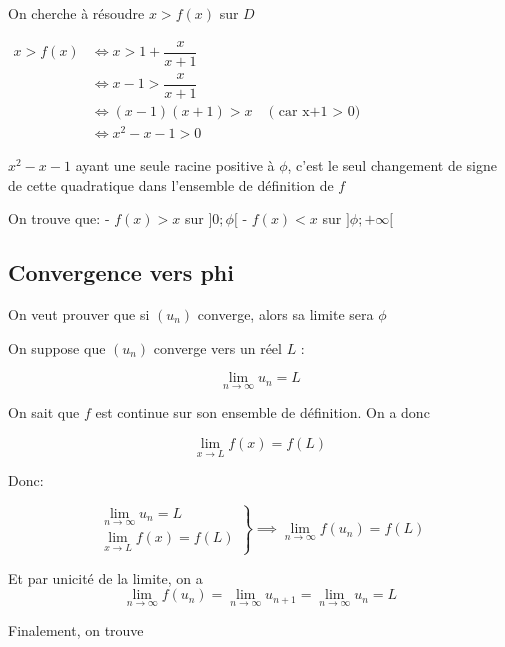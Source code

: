 \documentclass[]{scrartcl}
\begin{document}
\vspace*{2cm}{}

On cherche à résoudre \(x > f(x)\) sur \(D\)

\(\begin{array}{cl} x > f (x) &\iff x > 1 + \dfrac{x}{x+1}\\[3ex] &\iff x - 1 > \dfrac{x}{x+1}\\[3ex] &\iff (x - 1)(x+1) > x \;\;\; \text{ ( car x+1 > 0)}\\[2ex] &\iff x^2 - x - 1 > 0 \end{array}\)

\vspace*{2cm}{}

\(x^2 - x - 1\) ayant une seule racine positive à \(\phi\), c'est le
seul changement de signe de cette quadratique dans l'ensemble de
définition de \(f\)

On trouve que: - \(f(x) > x\) sur \(]0 ; \phi[\) - \(f(x) < x\) sur
\(]\phi; +\infty[\)

\vspace*{2cm}{}

\hypertarget{convergence-vers-phi}{%
\subsection{Convergence vers phi}\label{convergence-vers-phi}}

On veut prouver que si \((u_n)\) converge, alors sa limite sera \(\phi\)

On suppose que \((u_n)\) converge vers un réel \(L\) :

\[
\lim_{n \to\infty} u_n = L
\]

\vspace*{2cm}{}

On sait que \(f\) est continue sur son ensemble de définition. On a donc

\[
\lim_{x \to L} f(x) = f(L)
\]

Donc:

\[
\left .
\begin{array}{cl}
    \displaystyle\lim_{n \to \infty} u_n = L\\[5ex]
    \displaystyle\lim_{x \to L} f(x) = f(L)
\end{array}
\right \} \implies \lim_{n\to\infty} f(u_n) = f(L)
\]

Et par unicité de la limite, on a \[
\lim_{n \to\infty} f(u_n) = \lim_{n \to\infty} u_{n+1} = \lim_{n \to\infty}u_n = L
\]

Finalement, on trouve
\end{document}
